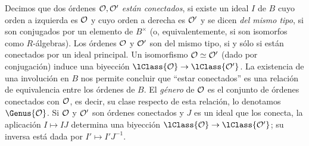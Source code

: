 Decimos que dos \'{o}rdenes $\cal{O},\cal{O}'$ \emph{est\'{a}n conectados},
si existe un ideal $I$ de $B$ cuyo orden a izquierda es $\cal{O}$ y cuyo
orden a derecha es $\cal{O}'$ y se dicen \emph{del mismo tipo},
si son conjugados por un elemento de $B^{\times}$ (o, equivalentemente, si
son isomorfos como $R$-\'{a}lgebras). Los \'{o}rdenes $\cal{O}$ y $\cal{O}'$
son del mismo tipo, si y s\'{o}lo si est\'{a}n conectados por un ideal
principal. Un isomorfismo $\cal{O}\simeq\cal{O}'$ (dado por conjugaci\'{o}n)
induce una biyecci\'{o}n $\lClass{\cal{O}}\rightarrow\lClass{\cal{O}'}$.
La existencia de una involuci\'{o}n en $B$ nos permite concluir
que ``estar conectados'' es una relaci\'{o}n de equivalencia entre los
\'{o}rdenes de $B$. El \emph{g\'{e}nero}
de $\cal{O}$ es el conjunto de \'{o}rdenes conectados con $\cal{O}$, es
decir, su clase respecto de esta relaci\'{o}n, lo denotamos $\Genus{\cal{O}}$.
Si $\cal{O}$ y $\cal{O}'$ son \'{o}rdenes conectados
y $J$ es un ideal que los conecta, la aplicaci\'{o}n $I\mapsto IJ$ determina
una biyecci\'{o}n $\lClass{\cal{O}}\rightarrow\lClass{\cal{O}'}$;
su inversa est\'{a} dada por $I'\mapsto I'J^{-1}$.
%
%
%
% 

